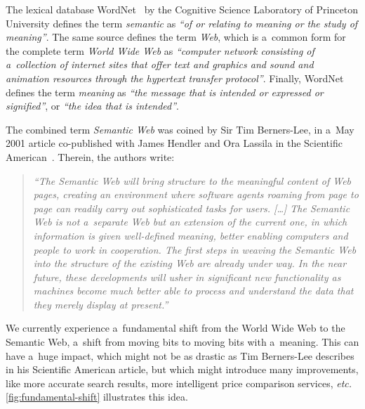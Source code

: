 The lexical database
WordNet~\cite{fellbaum1998wordnet,miller1995wordnet}
by the Cognitive Science Laboratory
of Princeton University defines the term \emph{semantic}
as \emph{``of or relating to meaning or the study of meaning''}.
The same source defines the term \emph{Web},
which is a~common form for the complete term
\emph{World Wide Web} as
\emph{``computer network consisting of a~collection of internet sites that offer text and graphics and
sound and animation resources through the hypertext
transfer protocol''}.
Finally, WordNet defines the term \emph{meaning}
as \emph{``the message that is intended or expressed
or signified''}, or \emph{``the idea that is intended''}.

The combined term \emph{Semantic Web} was coined
by Sir Tim Berners-Lee,
in a~May 2001 article co-published with James Hendler
and Ora Lassila
in the Scientific American~\cite{bernerslee2001semanticweb}.
Therein, the authors write: 

\begin{quotation}
\textit{``The Semantic Web will bring structure to the meaningful
content of Web pages,
creating an environment where software agents
roaming from page to page
can readily carry out sophisticated tasks for users. [\ldots]
The Semantic Web is not a~separate Web
but an extension of the current one,
in which information is given well-defined meaning,
better enabling computers and people
to work in cooperation.
The first steps in weaving the Semantic Web
into the structure of the existing Web
are already under way.
In the near future, these developments
will usher in significant new functionality
as machines become much better able to process and \emph{understand} the data
that they merely display at present.''}
\end{quotation}

We currently experience a~fundamental shift
from the World Wide Web to the Semantic Web,
a~shift from moving bits to moving bits with a~meaning.
This can have a~huge impact,
which might not be as drastic as Tim Berners-Lee describes
in his Scientific American article,
but which might introduce many improvements,
like more accurate search results,
more intelligent price comparison services, \emph{etc.}
\autoref{fig:fundamental-shift} illustrates this idea.

